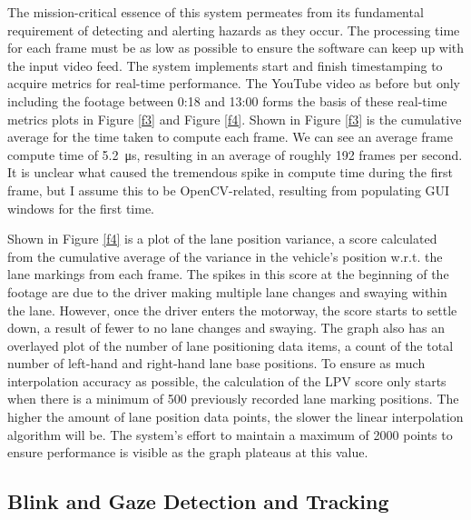 \documentclass[9pt,conference]{IEEEtran}
\begin{document}
The mission-critical essence of this system permeates from its fundamental requirement of detecting and alerting hazards as they occur. The processing time for each frame must be as low as possible to ensure the software can keep up with the input video feed. The system implements start and finish timestamping to acquire metrics for real-time performance. The YouTube video as before \cite{b8} but only including the footage between 0:18 and 13:00 forms the basis of these real-time metrics plots in Figure \ref{f3} and Figure \ref{f4}. Shown in Figure \ref{f3} is the cumulative average for the time taken to compute each frame. We can see an average frame compute time of \SI{5.2}{\micro\second}, resulting in an average of roughly 192 frames per second. It is unclear what caused the tremendous spike in compute time during the first frame, but I assume this to be OpenCV-related, resulting from populating GUI windows for the first time.

Shown in Figure \ref{f4} is a plot of the lane position variance, a score calculated from the cumulative average of the variance in the vehicle's position w.r.t. the lane markings from each frame. The spikes in this score at the beginning of the footage are due to the driver making multiple lane changes and swaying within the lane. However, once the driver enters the motorway, the score starts to settle down, a result of fewer to no lane changes and swaying. The graph also has an overlayed plot of the number of lane positioning data items, a count of the total number of left-hand and right-hand lane base positions. To ensure as much interpolation accuracy as possible, the calculation of the LPV score only starts when there is a minimum of 500 previously recorded lane marking positions. The higher the amount of lane position data points, the slower the linear interpolation algorithm will be. The system's effort to maintain a maximum of 2000 points to ensure performance is visible as the graph plateaus at this value.

\subsection{Blink and Gaze Detection and Tracking}
\end{document}
